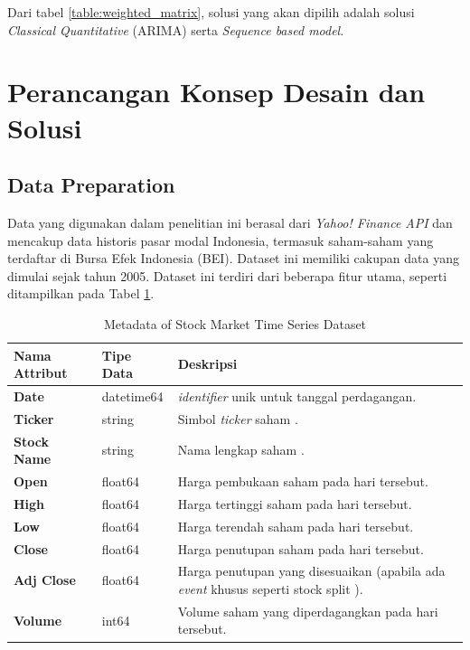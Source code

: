 Dari tabel \ref{table:weighted_matrix}, solusi yang akan dipilih adalah solusi \textit{Classical Quantitative} (ARIMA) serta \textit{Sequence based model}.

\section{Perancangan Konsep Desain dan Solusi}
\subsection{Data Preparation}

Data yang digunakan dalam penelitian ini berasal dari \textit{Yahoo! Finance API} dan mencakup data historis pasar modal Indonesia, termasuk saham-saham yang terdaftar di Bursa Efek Indonesia (BEI). Dataset ini memiliki cakupan data yang dimulai sejak tahun 2005. Dataset ini terdiri dari beberapa fitur utama, seperti ditampilkan pada Tabel \ref{table:stock_metadata}.

\begin{table}[H]
\caption{Metadata of Stock Market Time Series Dataset}
\label{table:stock_metadata}
\begin{tabular}{|p{4cm}|p{3cm}|p{8cm}|}
\hline
\textbf{Nama Attribut} & \textbf{Tipe Data} & \textbf{Deskripsi} \\ \hline
\textbf{Date} & datetime64 & \textit{identifier} unik untuk tanggal perdagangan. \\ \hline
\textbf{Ticker} & string & Simbol \textit{ticker} saham . \\ \hline
\textbf{Stock Name} & string & Nama lengkap saham . \\ \hline
\textbf{Open} & float64 & Harga pembukaan saham pada hari tersebut. \\ \hline
\textbf{High} & float64 & Harga tertinggi saham pada hari tersebut. \\ \hline
\textbf{Low} & float64 & Harga terendah saham pada hari tersebut. \\ \hline
\textbf{Close} & float64 & Harga penutupan saham pada hari tersebut. \\ \hline
\textbf{Adj Close} & float64 & Harga penutupan yang disesuaikan (apabila ada \textit{event} khusus seperti stock split ). \\ \hline
\textbf{Volume} & int64 & Volume saham yang diperdagangkan pada hari tersebut. \\ \hline
\end{tabular}
\end{table}

